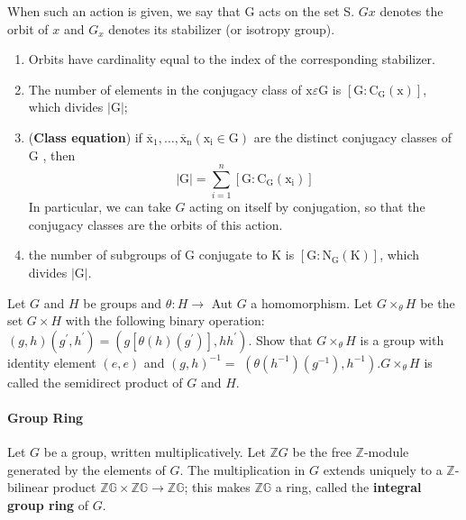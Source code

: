 When such an action is given, we say that G acts on the set S. $Gx$ denotes the orbit of $x$ and $G_x$ denotes its stabilizer (or isotropy group).



\begin{theo}
    \begin{enumerate}
        \item Orbits have cardinality equal to the index of the corresponding stabilizer.
        \item The number of elements in the conjugacy class of $\mathrm{x} \varepsilon \mathrm{G}$ is $\left[\mathrm{G}: \mathrm{C}_{\mathrm{G}}(\mathrm{x})\right]$, which divides $|\mathrm{G}|$;
        \item (\textbf{Class equation}) if $\overline{\mathrm{x}}_1, \ldots, \overline{\mathrm{x}}_{\mathrm{n}}\left(\mathrm{x}_{\mathrm{i}} \in \mathrm{G}\right)$ are the distinct conjugacy classes of G , then $$
|\mathrm{G}|=\sum_{i=1}^n\left[\mathrm{G}: \mathrm{C}_{\mathrm{G}}\left(\mathrm{x}_{\mathrm{i}}\right)\right]
$$ In particular, we can take $G$ acting on itself by conjugation, so that the conjugacy classes are the orbits of this action.
\item the number of subgroups of G conjugate to K is $\left[\mathrm{G}: \mathrm{N}_{\mathrm{G}}(\mathrm{K})\right]$, which divides $|\mathrm{G}|$.
\end{enumerate}
\end{theo}

Let $G$ and $H$ be groups and $\theta: H \rightarrow$ Aut $G$ a homomorphism. Let $G \times_\theta H$ be the set $G \times H$ with the following binary operation: $(g, h)\left(g^{\prime}, h^{\prime}\right)=\left(g\left[\theta(h)\left(g^{\prime}\right)\right], h h^{\prime}\right)$. Show that $G \times_\theta H$ is a group with identity element $(e, e)$ and $(g, h)^{-1}=$ $\left(\theta\left(h^{-1}\right)\left(g^{-1}\right), h^{-1}\right) . G \times_\theta H$ is called the semidirect product of $G$ and $H$.




\paragraph*{Group Ring}

Let $G$ be a group, written multiplicatively. Let $\mathbb{Z} G$ be the free $\mathbb{Z}$-module generated by the elements of $G$. The multiplication in $G$ extends uniquely to a $\mathbb{Z}$-bilinear product $\mathbb{Z G} \times \mathbb{Z G} \rightarrow \mathbb{Z G}$; this makes $\mathbb{Z G}$ a ring, called the \textbf{integral group ring} of $G$.

